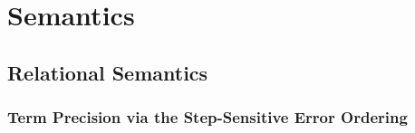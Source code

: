 \section{Semantics}\label{sec:semantics}


\subsection{Relational Semantics}

\subsubsection{Term Precision via the Step-Sensitive Error Ordering}


